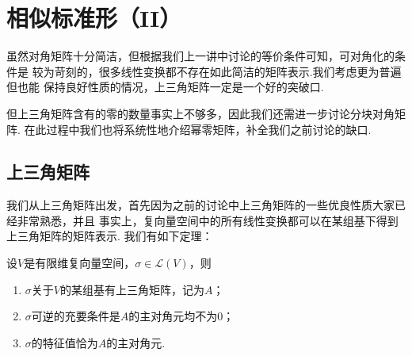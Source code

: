 \chapter{相似标准形（II）}

虽然对角矩阵十分简洁，但根据我们上一讲中讨论的等价条件可知，可对角化的条件是
较为苛刻的，很多线性变换都不存在如此简洁的矩阵表示.我们考虑更为普遍但也能
保持良好性质的情况，上三角矩阵一定是一个好的突破口.

但上三角矩阵含有的零的数量事实上不够多，因此我们还需进一步讨论分块对角矩阵.
在此过程中我们也将系统性地介绍幂零矩阵，补全我们之前讨论的缺口.

\section{上三角矩阵}
我们从上三角矩阵出发，首先因为之前的讨论中上三角矩阵的一些优良性质大家已经非常熟悉，并且
事实上，复向量空间中的所有线性变换都可以在某组基下得到上三角矩阵的矩阵表示.
我们有如下定理：
\begin{theorem}\label{thm:20:上三角矩阵存在}
    设$V$是有限维复向量空间，$\sigma\in \mathcal{L}(V)$，则
    \begin{enumerate}
        \item $\sigma$关于$V$的某组基有上三角矩阵，记为$A$；

        \item $\sigma$可逆的充要条件是$A$的主对角元均不为0；

        \item $\sigma$的特征值恰为$A$的主对角元.
    \end{enumerate}
\end{theorem}
